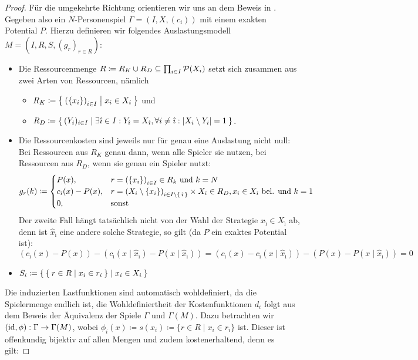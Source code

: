 \begin{proof}
		
	Für die umgekehrte Richtung orientieren wir uns an dem Beweis in \cite[Theorem 1]{MultiPotGames}. Gegeben also ein $N$-Personenspiel $\Gamma = (I, X, (c_i))$ mit einem exakten Potential $P$. Hierzu definieren wir folgendes Auslastungsmodell $M = (I, R, S, (g_r)_{r \in R})$:
	\begin{itemize}
		\item Die Ressourcenmenge $R \coloneqq R_K \cup R_D \subseteq \prod_{i \in I}\mathcal{P}(X_i)$ setzt sich zusammen aus zwei Arten von Ressourcen, nämlich 
			\begin{itemize}
				\item $R_K \coloneqq \Set{\left(\{x_i\}\right)_{i \in I} | x_i \in X_i }$ und 
				\item $R_D \coloneqq \Set{(Y_i)_{i \in I} | \exists \hat{\imath} \in I: Y_{\hat{\imath}} = X_{\hat{\imath}}, \forall i \neq \hat{\imath}: \left|X_i \setminus Y_i\right| = 1 }$.
			\end{itemize}
		\item Die Ressourcenkosten sind jeweils nur für genau eine Auslastung nicht null: Bei Ressourcen aus $R_K$ genau dann, wenn alle Spieler sie nutzen, bei Ressourcen aus $R_D$, wenn sie genau ein Spieler nutzt:
				\[g_r(k) \coloneqq 
					\begin{cases}
						P(x), 					&r = \left(\{x_i\}\right)_{i \in I} \in R_k 													\text{ und } k=N \\
						c_{\hat{\imath}}(x) - P(x), 	&r = \left(X_i\setminus\{x_i\}\right)_{i \in I\setminus\set{\hat{\imath}}} \times X_{\hat{\imath}} \in R_D, x_{\hat{\imath}} \in X_{\hat{\imath}} \text{ bel. und } k=1 \\
						0,						&\text{sonst}
					\end{cases}
				\]
			Der zweite Fall hängt tatsächlich nicht von der Wahl der Strategie $x_{\hat{\imath}} \in X_{\hat{\imath}}$ ab, denn ist $\hat{x}_{\hat{\imath}}$ eine andere solche Strategie, so gilt (da $P$ ein exaktes Potential ist):
			\[\left(c_{\hat{\imath}}(x) - P(x)\right) - \left(c_{\hat{\imath}}(x \mid \hat{x}_{\hat{\imath}}) - P(x \mid \hat{x}_{\hat{\imath}})\right) = \left(c_{\hat{\imath}}(x) - c_{\hat{\imath}}(x \mid \hat{x}_{\hat{\imath}})\right) - \left(P(x) - P(x \mid \hat{x}_{\hat{\imath}})\right) = 0\]
		\item $S_i \coloneqq \Set{ \Set{r \in R | x_i \in r_i} | x_i \in X_i }$
	\end{itemize}
	Die induzierten Lastfunktionen sind automatisch wohldefiniert, da die Spielermenge endlich ist, die Wohldefiniertheit der Kostenfunktionen $d_i$ folgt aus dem Beweis der Äquivalenz der Spiele $\Gamma$ und $\Gamma(M)$. Dazu betrachten wir $(\mathrm{id}, \phi): \Gamma \to \Gamma(M)$, wobei $\phi_i(x) \coloneqq s(x_i) \coloneqq \{r \in R \mid x_i \in r_i\}$ ist. Dieser ist offenkundig bijektiv auf allen Mengen und zudem kostenerhaltend, denn es gilt:

\end{proof}
